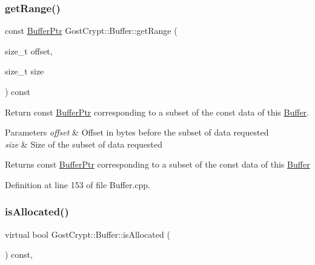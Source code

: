 \subsubsection{\texorpdfstring{get\+Range()}{getRange()}\hspace{0.1cm}{\footnotesize\ttfamily [2/2]}}
{\footnotesize\ttfamily const \hyperlink{class_gost_crypt_1_1_buffer_ptr}{Buffer\+Ptr} Gost\+Crypt\+::\+Buffer\+::get\+Range (\begin{DoxyParamCaption}\item[{size\+\_\+t}]{offset,  }\item[{size\+\_\+t}]{size }\end{DoxyParamCaption}) const}



Return const \hyperlink{class_gost_crypt_1_1_buffer_ptr}{Buffer\+Ptr} corresponding to a subset of the const data of this \hyperlink{class_gost_crypt_1_1_buffer}{Buffer}. 


\begin{DoxyParams}{Parameters}
{\em offset} & Offset in bytes before the subset of data requested \\
\hline
{\em size} & Size of the subset of data requested \\
\hline
\end{DoxyParams}
\begin{DoxyReturn}{Returns}
const \hyperlink{class_gost_crypt_1_1_buffer_ptr}{Buffer\+Ptr} corresponding to a subset of the const data of this \hyperlink{class_gost_crypt_1_1_buffer}{Buffer} 
\end{DoxyReturn}


Definition at line 153 of file Buffer.\+cpp.

\mbox{\label{class_gost_crypt_1_1_buffer_ad193e36c7ef06d6e6c31d90c2c5608ed}} 
\subsubsection{\texorpdfstring{is\+Allocated()}{isAllocated()}}
{\footnotesize\ttfamily virtual bool Gost\+Crypt\+::\+Buffer\+::is\+Allocated (\begin{DoxyParamCaption}{ }\end{DoxyParamCaption}) const\hspace{0.3cm}{\ttfamily [inline]}, {\ttfamily [virtual]}}



